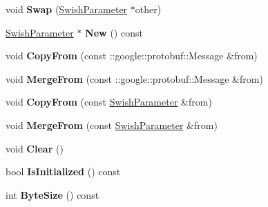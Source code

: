 \begin{DoxyCompactItemize}
\item 
\mbox{\label{classcaffe_1_1_swish_parameter_ac4c14a9df7f317c169ba7103f61233ba}} 
void {\bfseries Swap} (\mbox{\hyperlink{classcaffe_1_1_swish_parameter}{Swish\+Parameter}} $\ast$other)
\item 
\mbox{\label{classcaffe_1_1_swish_parameter_aeaf7b45bc941a939bb833a846b881654}} 
\mbox{\hyperlink{classcaffe_1_1_swish_parameter}{Swish\+Parameter}} $\ast$ {\bfseries New} () const
\item 
\mbox{\label{classcaffe_1_1_swish_parameter_a8b3c58372afd84b308a137e3b2041f84}} 
void {\bfseries Copy\+From} (const \+::google\+::protobuf\+::\+Message \&from)
\item 
\mbox{\label{classcaffe_1_1_swish_parameter_a3878f1880fc201a190f1e033bac6841a}} 
void {\bfseries Merge\+From} (const \+::google\+::protobuf\+::\+Message \&from)
\item 
\mbox{\label{classcaffe_1_1_swish_parameter_a699e5ab78e72f650bde18b5ddd3e8ca4}} 
void {\bfseries Copy\+From} (const \mbox{\hyperlink{classcaffe_1_1_swish_parameter}{Swish\+Parameter}} \&from)
\item 
\mbox{\label{classcaffe_1_1_swish_parameter_a8dc1dc25ccb94e1e3b7d501016d02366}} 
void {\bfseries Merge\+From} (const \mbox{\hyperlink{classcaffe_1_1_swish_parameter}{Swish\+Parameter}} \&from)
\item 
\mbox{\label{classcaffe_1_1_swish_parameter_a447a8a5f3f289f913188d197e26065d5}} 
void {\bfseries Clear} ()
\item 
\mbox{\label{classcaffe_1_1_swish_parameter_a3e75e32fb531542d7f9eba0d78ee751e}} 
bool {\bfseries Is\+Initialized} () const
\item 
\mbox{\label{classcaffe_1_1_swish_parameter_af90106f90cb9100b742c586c85493844}} 
int {\bfseries Byte\+Size} () const
\item 
\mbox{\label{classcaffe_1_1_swish_parameter_aa8c30590238b4736bdbad5c02be0fed2}} 

\end{DoxyCompactItemize}
